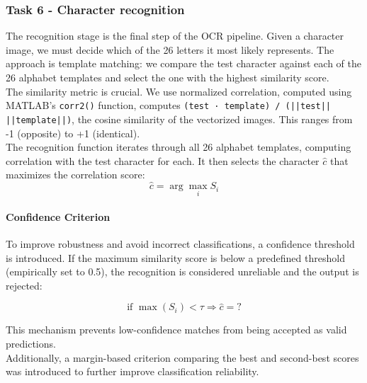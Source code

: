 \subsubsection{Task 6 - Character recognition}
The recognition stage is the final step of the OCR pipeline. Given a character image, we must decide which of the 26 letters it most likely represents. The approach is template matching: we compare the test character against each of the 26 alphabet templates and select the one with the highest similarity score.\\
The similarity metric is crucial. We use normalized correlation, computed using MATLAB's \texttt{corr2()} function, computes \texttt{(test · template) / (||test|| ||template||)}, the cosine similarity of the vectorized images. This ranges from -1 (opposite) to +1 (identical).\\


The recognition function iterates through all 26 alphabet templates, computing correlation with the test character for each. It then selects the character $\hat{c}$ that maximizes the correlation score:
\begin{equation}
\hat{c} = \arg\max_i S_i
\end{equation}

\paragraph{Confidence Criterion}

To improve robustness and avoid incorrect classifications, a confidence threshold is introduced. If the maximum similarity score is below a predefined threshold (empirically set to 0.5), the recognition is considered unreliable and the output is rejected:

\begin{equation}
\text{if } \max(S_i) < \tau \Rightarrow \hat{c} = \text{?}
\end{equation}

This mechanism prevents low-confidence matches from being accepted as valid predictions.\\

Additionally, a margin-based criterion comparing the best and second-best scores was introduced to further improve classification reliability.
